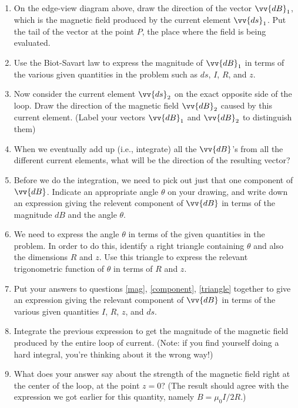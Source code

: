 \begin{enumerate}[labparts]
\item On the edge-view diagram above, draw the direction of the vector $\vv{dB}_1$,
which is the magnetic field produced by the current element $\vv{ds}_1$.  Put the
tail of the vector at the point $P$, the place where the field
is being evaluated.  

\item \label{mag}
Use the Biot-Savart law to express the magnitude of $\vv{dB}_1$
in terms of the various given quantities in the problem such as $ds$, $I$,
$R$, and $z$.
\answerspace{0.7in}

\item Now consider the current element $\vv{ds}_2$ on the exact opposite
side of the loop.  Draw the direction of the magnetic field $\vv{dB}_2$
caused by this current element.  (Label your vectors $\vv{dB}_1$ and $\vv{dB}_2$ 
to distinguish them)

\item When we eventually add up (i.e., integrate) all the $\vv{dB}$'s from
all the different current elements, what will be the direction of  
the resulting
vector?
\answerspace{0.5in}

\item \label{component}
Before we do the integration, we need to pick out just that
one component of $\vv{dB}$.  Indicate an appropriate angle $\theta$
on your drawing, and write down an expression giving the
relevent component of $\vv{dB}$ in terms of the magnitude
$dB$ and the angle $\theta$.
\answerspace{0.5in}

\item \label{triangle}
We need to express the angle $\theta$ in terms of the given
quantities in the problem.  In order to do this, identify a right
triangle containing $\theta$ and also the dimensions $R$ and $z$.  Use this triangle
to express the relevant trigonometric function of $\theta$
in terms of $R$ and $z$.  
\answerspace{0.5in}

\item Put your answers to questions \ref{mag}, \ref{component},
\ref{triangle} together
to give an expression giving the relevant component of $\vv{dB}$
in terms of the various given quantities $I$, $R$, $z$, and $ds$.
\answerspace{0.5in}

\item \label{answer1}
Integrate the previous expression to get the magnitude of the
magnetic field produced by the entire loop of current.  (Note: if you
find yourself doing a hard integral, you're thinking about it the wrong
way!)
\answerspace{1in}

\item What does your answer say about the strength of the magnetic
field right at the center of the loop, at the point $z=0$?
(The result should agree with the expression we got earlier for 
this quantity, namely $B=\mu_0I/2R$.)
\answerspace{0.5in}

\end{enumerate}

